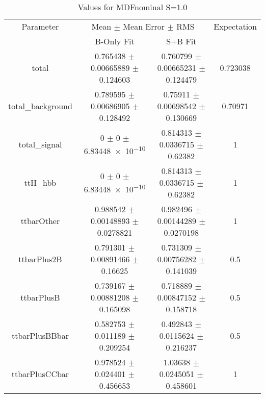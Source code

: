 \begin{table}
\centering
\caption{Values for MDFnominal S=1.0}
\begin{tabular}{cccc}
\toprule
Parameter & \multicolumn{2}{c}{Mean $\pm$ Mean Error $\pm$ RMS} & Expectation\\
 & B-Only Fit & S+B Fit & \\
\midrule
total & \num{0.765438} $\pm$ \num{0.00665889} $\pm$ \num{0.124603} & \num{0.760799} $\pm$ \num{0.00665231} $\pm$ \num{0.124479} & \num{0.723038}\\
total\_background & \num{0.789595} $\pm$ \num{0.00686905} $\pm$ \num{0.128492} & \num{0.75911} $\pm$ \num{0.00698542} $\pm$ \num{0.130669} & \num{0.70971}\\
total\_signal & \num{0} $\pm$ \num{0} $\pm$ \num{6.83448e-10} & \num{0.814313} $\pm$ \num{0.0336715} $\pm$ \num{0.62382} & \num{1}\\
ttH\_hbb & \num{0} $\pm$ \num{0} $\pm$ \num{6.83448e-10} & \num{0.814313} $\pm$ \num{0.0336715} $\pm$ \num{0.62382} & \num{1}\\
ttbarOther & \num{0.988542} $\pm$ \num{0.00148893} $\pm$ \num{0.0278821} & \num{0.982496} $\pm$ \num{0.00144289} $\pm$ \num{0.0270198} & \num{1}\\
ttbarPlus2B & \num{0.791301} $\pm$ \num{0.00891466} $\pm$ \num{0.16625} & \num{0.731309} $\pm$ \num{0.00756282} $\pm$ \num{0.141039} & \num{0.5}\\
ttbarPlusB & \num{0.739167} $\pm$ \num{0.00881208} $\pm$ \num{0.165098} & \num{0.718889} $\pm$ \num{0.00847152} $\pm$ \num{0.158718} & \num{0.5}\\
ttbarPlusBBbar & \num{0.582753} $\pm$ \num{0.011189} $\pm$ \num{0.209254} & \num{0.492843} $\pm$ \num{0.0115624} $\pm$ \num{0.216237} & \num{0.5}\\
ttbarPlusCCbar & \num{0.978524} $\pm$ \num{0.024401} $\pm$ \num{0.456653} & \num{1.03638} $\pm$ \num{0.0245051} $\pm$ \num{0.458601} & \num{1}\\
\bottomrule
\end{tabular}
\end{table}